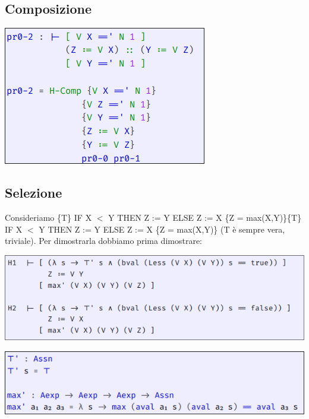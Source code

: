 \subsection{Composizione}

\begin{center}
 \includegraphics[scale = 0.6]{images/IMP/pr0-2}
\end{center}


\subsection{Selezione}

Consideriamo \{T\} IF X $<$ Y THEN Z := Y ELSE Z := X \{Z = max(X,Y)\}\{T\} IF X $<$ Y THEN Z := Y ELSE Z := X \{Z = max(X,Y)\} (T è sempre vera, triviale). Per dimostrarla dobbiamo prima dimostrare:

\begin{center}
  \includegraphics[scale = 0.5]{images/IMP/Ipotesi}
\end{center}

\begin{center}
  \includegraphics[scale = 0.5]{images/IMP/T-max}
\end{center}

